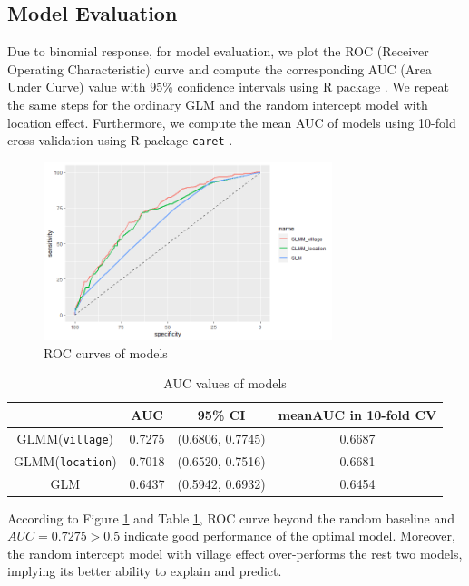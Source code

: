 \documentclass[11pt,twoside]{article}
\numberwithin{Theorem}{section}
\numberwithin{Definition}{section}
\numberwithin{Lemma}{section}
\numberwithin{Algorithm}{section}
\numberwithin{equation}{section}
\begin{document}
\subsection{Model Evaluation}

Due to binomial response, for model evaluation, we plot the ROC (Receiver Operating Characteristic) curve and compute the corresponding AUC (Area Under Curve) value with 95\% confidence intervals using R package \cite{proc}. We repeat the same steps for the ordinary GLM and the random intercept model with location effect. Furthermore, we compute the mean AUC of models using 10-fold cross validation using R package \texttt{caret} \cite{caret}. 

\begin{figure}[!h]
	\centering
	\includegraphics[width = 0.75\textwidth]{Images/ROC.png}
	\caption{ROC curves of models} 
	\label{fig:pROC}
\end{figure}

\begin{table}[!h]
	\centering
	\begin{tabular}{|c|c|c|c|}
		\hline
		 & AUC & 95\% CI & meanAUC in 10-fold CV\\
		\hline
		GLMM(\texttt{village}) & 0.7275 & (0.6806, 0.7745) & 0.6687 \\
		GLMM(\texttt{location}) & 0.7018 & (0.6520, 0.7516) & 0.6681 \\
		GLM & 0.6437 & (0.5942, 0.6932) & 0.6454 \\
		\hline	
	\end{tabular}
	\caption{AUC values of models}
	\label{tab:AUC}
\end{table}

According to Figure \ref{fig:pROC} and Table \ref{tab:AUC}, ROC curve beyond the random baseline and $AUC = 0.7275 > 0.5$ indicate good performance of the optimal model. Moreover, the random intercept model with village effect over-performs the rest two models, implying its better ability to explain and predict. 
\end{document}
